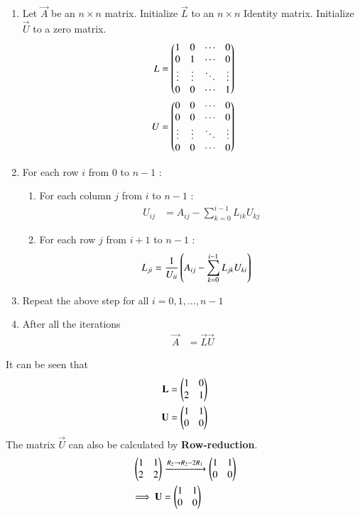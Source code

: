 \documentclass[journal]{IEEEtran}
\begin{document}
\begin{enumerate}
	\item Let $\vec{A}$ be an $n \times n$ matrix. Initialize $\vec{L}$ to an $n \times n$ Identity matrix. Initialize $\vec{U}$ to a zero matrix.
	\begin{align}
		L &= \begin{pmatrix}1 & 0 & \cdots & 0 \\
		            0 & 1 & \cdots & 0 \\
		            \vdots & \vdots & \ddots & \vdots \\
		            0 & 0 & \cdots & 1\end{pmatrix} \\
		U &= \begin{pmatrix}0 & 0 & \cdots & 0 \\
			    0 & 0 & \cdots & 0 \\
                            \vdots & \vdots & \ddots & \vdots \\
                            0 & 0 & \cdots & 0\end{pmatrix}
	\end{align}
	\item For each row $i$ from $0$ to $n-1$ :
	\begin{enumerate}
		\item For each column $j$ from $i$ to $n-1$ : 
		\begin{align}
			U_{ij} &= A_{ij} - \sum_{k=0}^{i-1} L_{ik} U_{kj}
		\end{align}
		\item For each row $j$ from $i+1$ to $n-1$ :
		\begin{align}
			L_{ji} &= \frac{1}{U_{ii}} \left(A_{ij} - \sum_{k=0}^{i-1} L_{jk} U_{ki}\right)
		\end{align}
	\end{enumerate}
	\item Repeat the above step for all $i = 0,1,\dots,n-1$
	\item After all the iterations
	\begin{align}
		\vec{A} &= \vec{L} \vec{U}
	\end{align}
\end{enumerate}
It can be seen that
\begin{align}
	\mathbf{L} &= \begin{pmatrix}1 & 0 \\ 2 & 1\end{pmatrix} \\
	\mathbf{U} &= \begin{pmatrix}1 & 1 \\ 0 & 0\end{pmatrix}
\end{align}
The matrix $\vec{U}$ can also be calculated by \textbf{Row-reduction}.
\begin{align}
	\begin{pmatrix}1 & 1 \\ 2 & 2\end{pmatrix} &\xrightarrow{R_{2} \rightarrow R_{2} - 2R_{1}} \begin{pmatrix}1 & 1 \\ 0 & 0\end{pmatrix} \\
	\implies \mathbf{U} &= \begin{pmatrix}1 & 1 \\ 0 & 0\end{pmatrix}
\end{align}
\end{document}
